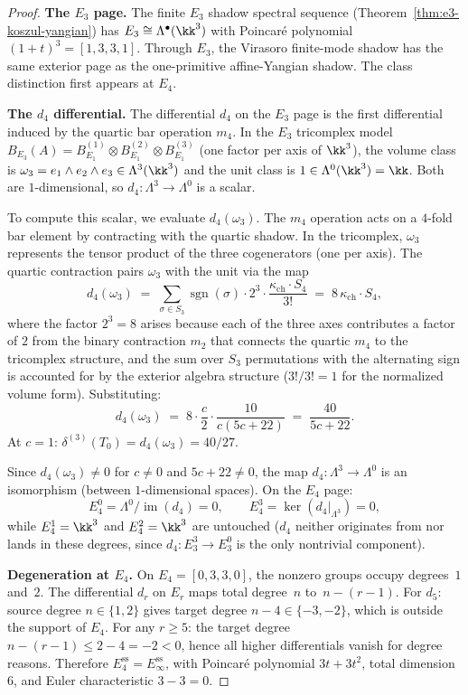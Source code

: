 \begin{proof}
\smallskip\noindent\textbf{The \(E_3\) page.}
The finite \(E_3\) shadow spectral sequence (Theorem~\ref{thm:e3-koszul-yangian}) has \(E_3 \cong \Lambda^\bullet(\kk^3)\) with Poincar\'{e} polynomial \((1+t)^3 = [1,3,3,1]\). Through \(E_3\), the Virasoro finite-mode shadow has the same exterior page as the one-primitive affine-Yangian shadow. The class distinction first appears at \(E_4\).

\smallskip\noindent\textbf{The \(d_4\) differential.}
The differential $d_4$ on the $E_3$ page is the first differential induced by the quartic bar operation $m_4$. In the $E_3$ tricomplex model $B_{E_3}(A) = B_{E_1}^{(1)} \otimes B_{E_1}^{(2)} \otimes B_{E_1}^{(3)}$ (one factor per axis of $\kk^3$), the volume class is $\omega_3 = e_1 \wedge e_2 \wedge e_3 \in \Lambda^3(\kk^3)$ and the unit class is $1 \in \Lambda^0(\kk^3) = \kk$. Both are $1$-dimensional, so $d_4 \colon \Lambda^3 \to \Lambda^0$ is a scalar.

To compute this scalar, we evaluate $d_4(\omega_3)$. The $m_4$ operation acts on a $4$-fold bar element by contracting with the quartic shadow. In the tricomplex, $\omega_3$ represents the tensor product of the three cogenerators (one per axis). The quartic contraction pairs $\omega_3$ with the unit via the map
\[
 d_4(\omega_3) \;=\; \sum_{\sigma \in S_3} \operatorname{sgn}(\sigma) \cdot 2^3 \cdot \frac{\kappa_{\mathrm{ch}} \cdot S_4}{3!} \;=\; 8\,\kappa_{\mathrm{ch}} \cdot S_4,
\]
where the factor $2^3 = 8$ arises because each of the three axes contributes a factor of $2$ from the binary contraction $m_2$ that connects the quartic $m_4$ to the tricomplex structure, and the sum over $S_3$ permutations with the alternating sign is accounted for by the exterior algebra structure ($3!/3! = 1$ for the normalized volume form). Substituting:
\[
 d_4(\omega_3) \;=\; 8 \cdot \frac{c}{2} \cdot \frac{10}{c(5c+22)} \;=\; \frac{40}{5c+22}.
\]
At $c = 1$: $\delta^{(3)}(T_0) = d_4(\omega_3) = 40/27$.

Since $d_4(\omega_3) \neq 0$ for $c \neq 0$ and $5c + 22 \neq 0$, the map $d_4 \colon \Lambda^3 \to \Lambda^0$ is an isomorphism (between $1$-dimensional spaces). On the $E_4$ page:
\[
 E_4^0 = \Lambda^0 / \operatorname{im}(d_4) = 0, \qquad E_4^3 = \ker(d_4|_{\Lambda^3}) = 0,
\]
while $E_4^1 = \kk^3$ and $E_4^2 = \kk^3$ are untouched ($d_4$ neither originates from nor lands in these degrees, since $d_4 \colon E_3^3 \to E_3^0$ is the only nontrivial component).

\smallskip\noindent\textbf{Degeneration at \(E_4\).}
On $E_4 = [0, 3, 3, 0]$, the nonzero groups occupy degrees~$1$ and~$2$. The differential $d_r$ on $E_r$ maps total degree~$n$ to~$n - (r-1)$. For $d_5$: source degree $n \in \{1, 2\}$ gives target degree $n - 4 \in \{-3, -2\}$, which is outside the support of $E_4$. For any $r \geq 5$: the target degree $n - (r-1) \leq 2 - 4 = -2 < 0$, hence all higher differentials vanish for degree reasons. Therefore $E^{\mathrm{ss}}_4 = E^{\mathrm{ss}}_\infty$, with Poincar\'{e} polynomial $3t + 3t^2$, total dimension~$6$, and Euler characteristic $3 - 3 = 0$.


\end{proof}
